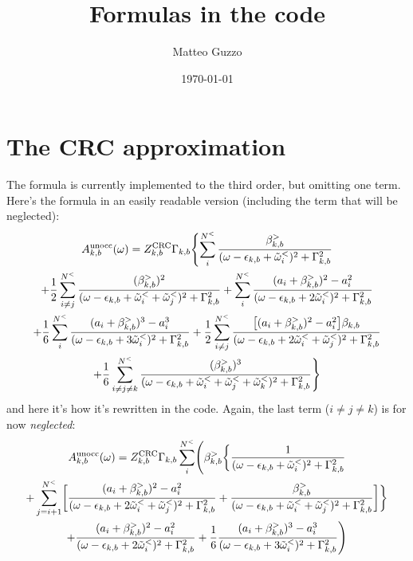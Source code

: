 \documentclass[a4paper,12pt]{article}
\title{Formulas in the code}
\author{Matteo Guzzo}
\date{\today}
\begin{document}
\maketitle

\tableofcontents

\section{The CRC approximation}

The formula is currently implemented to the third order, but omitting one term. 
Here's the formula in an easily readable version (including the term that will be neglected):
\begin{multline}
 A_{k,b}^\textnormal{unocc}(\omega) = Z_{k,b}^\textnormal{CRC} \Gamma_{k,b} \Biggl\{ 
  \sum_i^{N^<} \frac{\beta_{k,b}^>}{(\omega - \epsilon_{k,b} + \tilde\omega_i^<)^2 + \Gamma_{k,b}^2} \\
 + \frac12 \sum_{i\neq j}^{N^<} 
\frac{(\beta_{k,b}^>)^2}{(\omega - \epsilon_{k,b} + \tilde\omega_i^< + \tilde\omega_j^<)^2 + \Gamma_{k,b}^2}
 + \sum_i^{N^<} \frac{(a_i + \beta_{k,b}^>)^2 - a_i^2}{(\omega - \epsilon_{k,b} + 2 \tilde\omega_i^<)^2 + \Gamma_{k,b}^2} \\
 + \frac16 \sum_i^{N^<} \frac{(a_i + \beta_{k,b}^>)^3 - a_i^3}{(\omega - \epsilon_{k,b} + 3 \tilde\omega_i^<)^2 + \Gamma_{k,b}^2} 
 + \frac12 \sum_{i\neq j}^{N^<} \frac{\bigl[(a_i + \beta_{k,b}^>)^2 - a_i^2\bigr] \beta_{k,b} }
  {(\omega - \epsilon_{k,b} + 2\tilde\omega_i^< + \tilde\omega_j^<)^2 + \Gamma_{k,b}^2} \\
 + \frac16 \sum_{i\neq j\neq k}^{N^<} 
\frac{(\beta_{k,b}^>)^3}{(\omega - \epsilon_{k,b} + \tilde\omega_i^< + \tilde\omega_j^< + \tilde\omega_k^<)^2 + \Gamma_{k,b}^2}
\Biggr\}
\end{multline}
and here it's how it's rewritten in the code. Again, the last term ($i\neq j\neq k$) is for now \emph{neglected}: 
\begin{multline}
 A_{k,b}^\textnormal{unocc}(\omega) = Z_{k,b}^\textnormal{CRC} \Gamma_{k,b}  \sum_i^{N^<} \Biggl( \beta_{k,b}^> \biggl\{
 \frac1{(\omega - \epsilon_{k,b} + \tilde\omega_i^<)^2 + \Gamma_{k,b}^2}  \\ 
  + \sum_{j=i+1}^{N^<} \biggl[ \frac{(a_i + \beta_{k,b}^>)^2 - a_i^2 }
  {(\omega - \epsilon_{k,b} + 2 \tilde\omega_i^< + \tilde\omega_j^<)^2 + \Gamma_{k,b}^2} 
 + \frac{\beta_{k,b}^>}{(\omega - \epsilon_{k,b} + \tilde\omega_i^< + \tilde\omega_j^<)^2 + \Gamma_{k,b}^2}
 \biggr] \biggr\} \\
 + \frac{(a_i + \beta_{k,b}^>)^2 - a_i^2}{(\omega - \epsilon_{k,b} + 2 \tilde\omega_i^<)^2 + \Gamma_{k,b}^2} 
 + \frac16 \frac{(a_i + \beta_{k,b}^>)^3 - a_i^3}{(\omega - \epsilon_{k,b} + 3 \tilde\omega_i^<)^2 + \Gamma_{k,b}^2} 
 \Biggl)
\end{multline}
\end{document}
